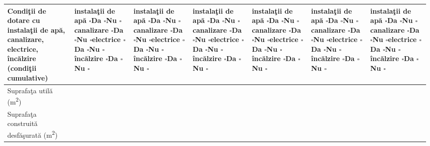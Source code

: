 \documentclass[10pt,a4paper,landscape]{article}
\newcommand{\checkboxempty}{$\square$}
\begin{document}
\begin{tabularx}{\textwidth}{|m{2.6cm}|X|X|X|X|X|X|}
Condiţii de dotare cu instalaţii de apă, canalizare, electrice, încălzire (condiţii cumulative) & instalaţii de apă \checkboxempty \quad Da \checkboxempty \quad Nu \checkboxempty \newline canalizare \checkboxempty \quad Da \checkboxempty \quad Nu \checkboxempty \newline electrice \checkboxempty \quad Da \checkboxempty \quad Nu \checkboxempty \newline încălzire \checkboxempty \quad Da \checkboxempty \quad Nu \checkboxempty & instalaţii de apă \checkboxempty \quad Da \checkboxempty \quad Nu \checkboxempty \newline canalizare \checkboxempty \quad Da \checkboxempty \quad Nu \checkboxempty \newline electrice \checkboxempty \quad Da \checkboxempty \quad Nu \checkboxempty \newline încălzire \checkboxempty \quad Da \checkboxempty \quad Nu \checkboxempty & instalaţii de apă \checkboxempty \quad Da \checkboxempty \quad Nu \checkboxempty \newline canalizare \checkboxempty \quad Da \checkboxempty \quad Nu \checkboxempty \newline electrice \checkboxempty \quad Da \checkboxempty \quad Nu \checkboxempty \newline încălzire \checkboxempty \quad Da \checkboxempty \quad Nu \checkboxempty & instalaţii de apă \checkboxempty \quad Da \checkboxempty \quad Nu \checkboxempty \newline canalizare \checkboxempty \quad Da \checkboxempty \quad Nu \checkboxempty \newline electrice \checkboxempty \quad Da \checkboxempty \quad Nu \checkboxempty \newline încălzire \checkboxempty \quad Da \checkboxempty \quad Nu \checkboxempty & instalaţii de apă \checkboxempty \quad Da \checkboxempty \quad Nu \checkboxempty \newline canalizare \checkboxempty \quad Da \checkboxempty \quad Nu \checkboxempty \newline electrice \checkboxempty \quad Da \checkboxempty \quad Nu \checkboxempty \newline încălzire \checkboxempty \quad Da \checkboxempty \quad Nu \checkboxempty & instalaţii de apă \checkboxempty \quad Da \checkboxempty \quad Nu \checkboxempty \newline canalizare \checkboxempty \quad Da \checkboxempty \quad Nu \checkboxempty \newline electrice \checkboxempty \quad Da \checkboxempty \quad Nu \checkboxempty \newline încălzire \checkboxempty \quad Da \checkboxempty \quad Nu \checkboxempty \\
\hline
Suprafaţa utilă (m\textsuperscript{2}) & & & & & & \\
\hline
Suprafaţa construită desfăşurată (m\textsuperscript{2}) & & & & & & \\
\hline
\end{tabularx}
\renewcommand{\arraystretch}{1}
\end{document}
